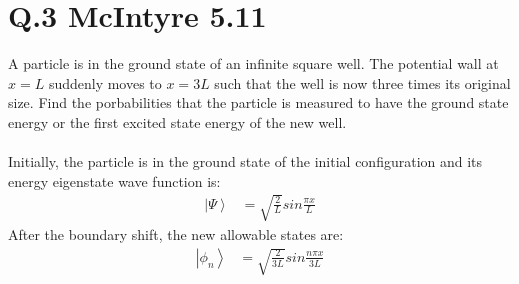 \documentclass[a4paper,12pt]{article}
\begin{document}
\section*{Q.3 McIntyre 5.11}
A particle is in the ground state of an infinite square well. The potential wall at $x=L$ suddenly moves to $x=3L$ such that the well is now three times its original size. Find the porbabilities that the particle is measured to have the ground state energy or the first excited state energy of the new well.\\
\\
Initially, the particle is in the ground state of the initial configuration and its energy eigenstate wave function is:
\begin{align*}
\left|\Psi\right>&=\sqrt{\frac{2}{L}}sin\frac{\pi x}{L}
\end{align*}
After the boundary shift, the new allowable states are:
\begin{align*}
\left|\phi_n\right>&=\sqrt{\frac{2}{3L}}sin\frac{n\pi x}{3L}
\end{align*}
\end{document}
